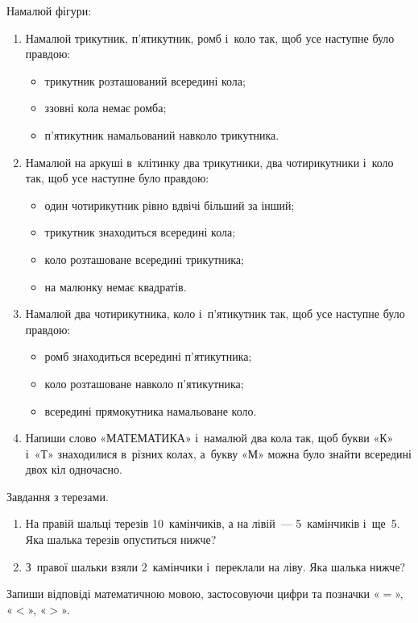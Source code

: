 \problem
Намалюй фігури:
\begin{enumerate}
  \item Намалюй трикутник, п'ятикутник, ромб і~коло так,
  щоб усе наступне було правдою:
  \begin{itemize}
    \item трикутник розташований всередині кола;
    \item ззовні кола немає ромба;
    \item п'ятикутник намальований навколо трикутника.
  \end{itemize}
  \item Намалюй на аркуші в~клітинку два трикутники,
  два чотирикутники і~коло так, щоб усе наступне було правдою:
  \begin{itemize}
    \item один чотирикутник рівно вдвічі більший за інший;
    \item трикутник знаходиться всередині кола;
    \item коло розташоване всередині трикутника;
    \item на малюнку немає квадратів.
  \end{itemize}
  \item Намалюй два чотирикутника, коло і~п'ятикутник так,
  щоб усе наступне було правдою:
  \begin{itemize}
    \item ромб знаходиться всередині п'ятикутника;
    \item коло розташоване навколо п'ятикутника;
    \item всередині прямокутника намальоване коло.
  \end{itemize}
  \item Напиши слово «МАТЕМАТИКА» і~намалюй два кола так,
  щоб букви «К» і~«Т» знаходилися в~різних колах,
  а~букву «М» можна було знайти всередині двох кіл одночасно.
\end{enumerate}


\problem
Завдання з терезами.
\begin{enumerate}
  \item На правій шальці терезів 10~камінчиків, а на лівій~---
  5~камінчиків і~ще~5. Яка шалька терезів опуститься нижче?
  \item З~правої шальки взяли 2~камінчики і~переклали на ліву.
  Яка шалька нижче?
\end{enumerate}
Запиши відповіді математичною мовою, застосовуючи цифри
та позначки «$=$», «$<$», «$>$».


